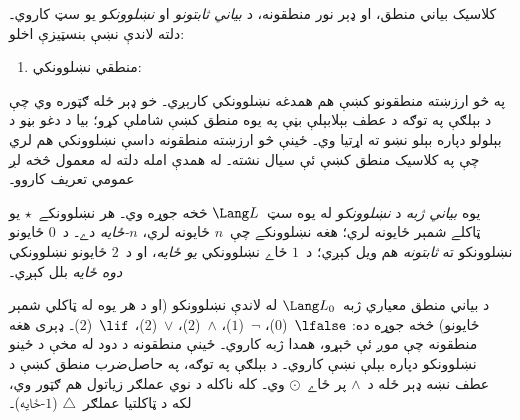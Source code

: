 \documentclass[../../../include/open-logic-section]{subfiles}
\begin{document}


کلاسيک بياني منطق، او ډېر نور منطقونه، د \emph{بياني ثابتونو} او
\emph{نښلوونکو} يو سټ کاروي۔ دلته لاندې نښې بنسټيزې اخلو:
\begin{enumerate}
\item منطقي نښلوونکي:
  \startycommalist
\end{enumerate}

په څو ارزښته منطقونو کښې هم همدغه نښلوونکي کارېږي۔ خو ډېر ځله
ګټوره وي چې د بېلګې په توګه د عطف بېلابېلې بڼې په يوه منطق کښې
شاملې کړو؛ بيا د دغو بڼو د بېلولو دپاره بېلو نښو ته اړتيا وي۔
ځينې څو ارزښته منطقونه داسې نښلوونکي هم لري چې په کلاسيک منطق
کښې ئې سيال نشته۔ له همدې امله دلته له معمول څخه لږ عمومي
تعريف کاروو۔

\begin{defn}
  يوه \emph{بياني ژبه} د \emph{نښلوونکو} له يوه سټ~$\Lang L$ څخه
  جوړه وي۔ هر نښلوونکے~$\star$ يو ټاکلے شمېر ځايونه لري؛ هغه
  نښلوونکے چې~$n$ ځايونه لري، \emph{$n$-ځايه} دے۔
  د~$0$ ځايونو نښلوونکو ته \emph{ثابتونه} هم ويل کېږي؛
  د~$1$ ځاے نښلوونکي \emph{يو ځايه}، او د~$2$ ځايونو
  نښلوونکي \emph{دوه ځايه} بلل کېږي۔
\end{defn}

\begin{ex}
  د بياني منطق معياري ژبه~$\Lang L_0$ له لاندې نښلوونکو
  (او د هر يوه له ټاکلي شمېر ځايونو) څخه جوړه ده:
  $\lfalse$~($0$)،
  $\lnot$~($1$)،
  $\land$~($2$)،
  $\lor$~($2$)،
  $\lif$~($2$)۔ ډېری هغه منطقونه چې موږ ئې څېړو، همدا ژبه
  کاروي۔ ځينې منطقونه د دود له مخې د ځينو نښلوونکو دپاره
  بېلې نښې کاروي۔ د بېلګې په توګه، په حاصل‌ضرب منطق کښې
  د عطف نښه ډېر ځله د~$\land$ پر ځاے~$\odot$ وي۔ کله ناکله
  د نوي عملګر زياتول هم ګټور وي، لکه د ټاکلتيا عملګر~$\triangle$
  ($1$-ځايه)۔
\end{ex}
\end{document}
